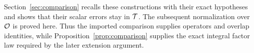 Section~\ref{sec:comparison} recalls these constructions with their
exact hypotheses and shows that their scalar errors stay in $\mathcal T$.
The subsequent normalization over $\mathcal O$ is proved here.  Thus the
imported comparison supplies operators and overlap identities, while
Proposition~\ref{prop:comparison} supplies the exact integral factor
law required by the later extension argument.
